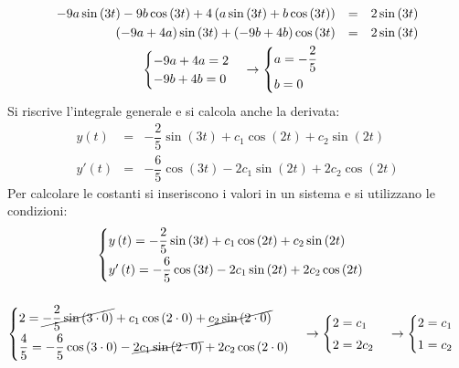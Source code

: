 \documentclass[a4paper]{article}
\begin{document}
	\begin{gather*}
		\begin{array}{rcl}
			-9a\sin\left(3t\right) - 9b\cos\left(3t\right) + 4\left(a\sin\left(3t\right) + b\cos\left(3t\right)\right) &=& 2\sin\left(3t\right) \\ [.3em]
			\left(-9a +4a\right)\sin\left(3t\right) + \left(-9b + 4b\right)\cos\left(3t\right) &=& 2\sin\left(3t\right)
		\end{array} \\
		\begin{cases}
			-9a+4a = 2 \\
			-9b+4b = 0
		\end{cases}
		\rightarrow
		\begin{cases}
			a = -\dfrac{2}{5} \vspace{.3em}\\
			b = 0
		\end{cases}
	\end{gather*}
	Si riscrive l'integrale generale e si calcola anche la derivata:
	\begin{equation*}
		\begin{array}{rcl}
			y\left(t\right) &=& -\dfrac{2}{5}\sin\left(3t\right) +
			c_{1}\cos\left(2t\right) + c_{2}\sin\left(2t\right) \\ [1em]
			y'\left(t\right) &=& -\dfrac{6}{5}\cos\left(3t\right) - 
			2c_{1}\sin\left(2t\right) + 2c_{2}\cos\left(2t\right)
		\end{array}
	\end{equation*}
	Per calcolare le costanti si inseriscono i valori in un sistema e si utilizzano le condizioni:
	\begin{gather*}
		\begin{cases}
			y\left(t\right) = -\dfrac{2}{5}\sin\left(3t\right) +
			c_{1}\cos\left(2t\right) + c_{2}\sin\left(2t\right) \vspace{.3em}\\
			y'\left(t\right) = -\dfrac{6}{5}\cos\left(3t\right) - 
			2c_{1}\sin\left(2t\right) + 2c_{2}\cos\left(2t\right)
		\end{cases} \\\\
		\begin{cases}
			2 = \cancel{-\dfrac{2}{5}\sin\left(3 \cdot 0\right)} +
			c_{1}\cos\left(2 \cdot 0\right) + \cancel{c_{2}\sin\left(2 \cdot 0\right)} \vspace{.3em}\\
			\dfrac{4}{5} = -\dfrac{6}{5}\cos\left(3 \cdot 0\right) - 
			\cancel{2c_{1}\sin\left(2 \cdot 0\right)} + 2c_{2}\cos\left(2 \cdot 0\right)
		\end{cases} 
		\rightarrow
		\begin{cases}
			2 = c_{1} \vspace{.3em}\\
			2 = 2c_{2}
		\end{cases}
		\rightarrow
		\begin{cases}
			2 = c_{1} \vspace{.3em}\\
			1 = c_{2}
		\end{cases}
	\end{gather*}
\end{document}

